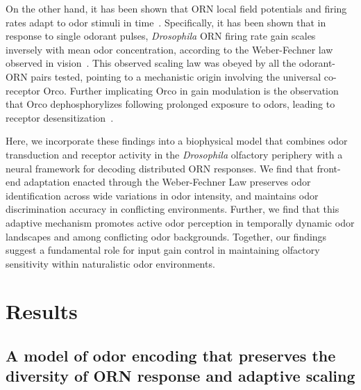 On the other hand, it has been shown that ORN local field potentials and firing rates adapt to odor stimuli in time~\cite{martelli, srinivas_elife, cao_WL}. Specifically, it has been shown that in response to single odorant pulses, \textit{Drosophila}  ORN firing rate gain scales inversely with mean odor concentration, according to the Weber-Fechner law observed in vision~\cite{cao_WL, cafaro_WL, srinivas_elife}. This observed scaling law was obeyed by all the odorant-ORN pairs tested, pointing to a mechanistic origin involving the universal co-receptor Orco. Further implicating Orco in gain modulation is the observation that Orco dephosphorylizes following prolonged exposure to odors, leading to receptor desensitization~\cite{Guo_Smith_review, Guo_Smith}. 

Here, we incorporate these findings into a biophysical model that combines odor transduction and receptor activity in the \textit{Drosophila} olfactory periphery with a neural framework for decoding distributed ORN responses. We find that front-end adaptation enacted through the Weber-Fechner Law preserves odor identification across wide variations in odor intensity, and maintains odor discrimination accuracy in conflicting environments. Further, we find that this adaptive mechanism promotes active odor perception in temporally dynamic odor landscapes and among conflicting odor backgrounds. Together, our findings suggest a fundamental role for input gain control in maintaining olfactory sensitivity within naturalistic odor environments. 






\section{Results}






\subsection{A model of odor encoding that preserves the diversity of ORN response and adaptive scaling}


